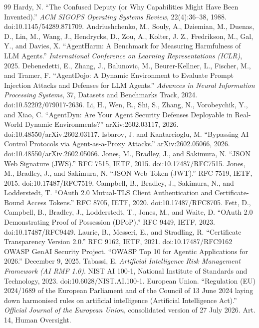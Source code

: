 \documentclass[11pt]{article}
\begin{document}
\begin{thebibliography}{99}
 Hardy, N. ``The Confused Deputy (or Why Capabilities Might Have Been Invented).'' \textit{ACM SIGOPS Operating Systems Review}, 22(4):36--38, 1988. doi:10.1145/54289.871709.
Andriushchenko, M., Souly, A., Dziemian, M., Duenas, D., Lin, M., Wang, J., Hendrycks, D., Zou, A., Kolter, J. Z., Fredrikson, M., Gal, Y., and Davies, X. ``AgentHarm: A Benchmark for Measuring Harmfulness of LLM Agents.'' \textit{International Conference on Learning Representations (ICLR)}, 2025.
Debenedetti, E., Zhang, J., Balunovic, M., Beurer-Kellner, L., Fischer, M., and Tramer, F. ``AgentDojo: A Dynamic Environment to Evaluate Prompt Injection Attacks and Defenses for LLM Agents.'' \textit{Advances in Neural Information Processing Systems}, 37, Datasets and Benchmarks Track, 2024. doi:10.52202/079017-2636.
 Li, H., Wen, R., Shi, S., Zhang, N., Vorobeychik, Y., and Xiao, C. ``AgentDyn: Are Your Agent Security Defenses Deployable in Real-World Dynamic Environments?'' arXiv:2602.03117, 2026. doi:10.48550/arXiv.2602.03117.
 Isbarov, J. and Kantarcioglu, M. ``Bypassing AI Control Protocols via Agent-as-a-Proxy Attacks.'' arXiv:2602.05066, 2026. doi:10.48550/arXiv.2602.05066.
 Jones, M., Bradley, J., and Sakimura, N. ``JSON Web Signature (JWS).'' RFC 7515, IETF, 2015. doi:10.17487/RFC7515.
 Jones, M., Bradley, J., and Sakimura, N. ``JSON Web Token (JWT).'' RFC 7519, IETF, 2015. doi:10.17487/RFC7519.
 Campbell, B., Bradley, J., Sakimura, N., and Lodderstedt, T. ``OAuth 2.0 Mutual-TLS Client Authentication and Certificate-Bound Access Tokens.'' RFC 8705, IETF, 2020. doi:10.17487/RFC8705.
 Fett, D., Campbell, B., Bradley, J., Lodderstedt, T., Jones, M., and Waite, D. ``OAuth 2.0 Demonstrating Proof of Possession (DPoP).'' RFC 9449, IETF, 2023. doi:10.17487/RFC9449.
 Laurie, B., Messeri, E., and Stradling, R. ``Certificate Transparency Version 2.0.'' RFC 9162, IETF, 2021. doi:10.17487/RFC9162
 OWASP GenAI Security Project. ``OWASP Top 10 for Agentic Applications for 2026.'' December 9, 2025.
 Tabassi, E. \textit{Artificial Intelligence Risk Management Framework (AI RMF 1.0)}. NIST AI 100-1, National Institute of Standards and Technology, 2023. doi:10.6028/NIST.AI.100-1.
European Union. ``Regulation (EU) 2024/1689 of the European Parliament and of the Council of 13 June 2024 laying down harmonised rules on artificial intelligence (Artificial Intelligence Act).'' \textit{Official Journal of the European Union}, consolidated version of 27 July 2026. Art. 14, Human Oversight.

\end{thebibliography}
\end{document}
